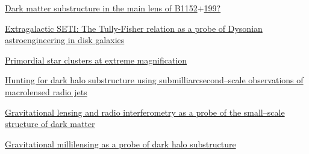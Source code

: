 
  \begin{cvitems}
    \vspace{.5\baselineskip}


    \item \small{\href{https://arxiv.org/abs/1811.06053}{ Dark
    matter substructure in the main lens of B1152$+$199?}}

    \item \href{http://iopscience.iop.org/article/10.1088/0004-637X/810/1/23/meta}{ Extragalactic
    SETI: The Tully-Fisher relation as a probe of Dysonian
    astroengineering in disk galaxies }

    \item \href{http://mnras.oxfordjournals.org/content/449/3/3057}{
    Primordial star clusters at extreme magnification }

    \item \small{\href{http://mnras.oxfordjournals.org/content/431/3/2172}{Hunting
    for dark halo substructure using submilliarcsecond--scale
    observations of macrolensed radio jets}}

    \item \small{\href{http://asadisaghar.github.io/Licentiate-thesis/}{Gravitational
    lensing and radio interferometry as a probe of the small--scale
    structure of dark matter}}

    \item \small{\href{http://asadisaghar.github.io/MSc-thesis/}{Gravitational
    millilensing as a probe of dark halo substructure}}

  \end{cvitems}
